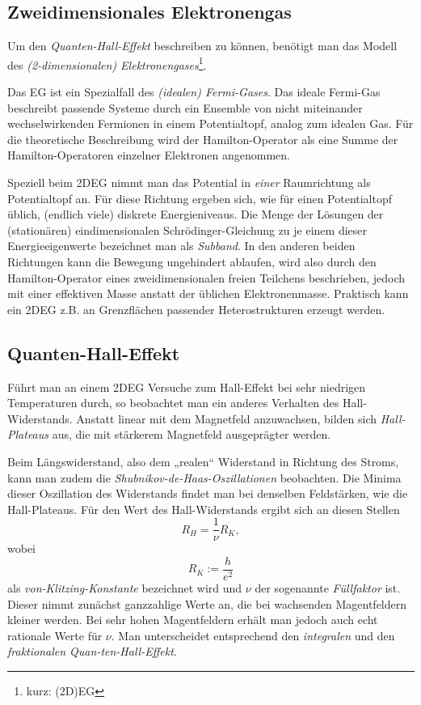 \subsection{Zweidimensionales Elektronengas}
Um den \emph{Quanten-Hall-Effekt} beschreiben zu können, benötigt man das Modell des \emph{(2-dimensionalen) Elektronengases}\footnote{kurz: (2D)EG}.

Das EG ist ein Spezialfall des \emph{(idealen) Fermi-Gases}. Das ideale Fermi-Gas beschreibt passende Systeme durch ein Ensemble von nicht miteinander wechselwirkenden Fermionen in einem Potentialtopf, analog zum idealen Gas.
Für die theoretische Beschreibung wird der Hamilton-Operator als eine Summe der Hamilton-Operatoren einzelner Elektronen angenommen.

Speziell beim 2DEG nimmt man das Potential in \emph{einer} Raumrichtung als Potentialtopf an. Für diese Richtung ergeben sich, wie für einen Potentialtopf üblich, (endlich viele) diskrete Energieniveaus. Die Menge der Lösungen der (stationären) eindimensionalen Schrödinger-Gleichung zu je einem dieser Energieeigenwerte bezeichnet man als \emph{Subband}.
In den anderen beiden Richtungen kann die Bewegung ungehindert ablaufen, wird also durch den Hamilton-Operator eines zweidimensionalen freien Teilchens beschrieben, jedoch mit einer effektiven Masse anstatt der üblichen Elektronenmasse.
Praktisch kann ein 2DEG z.B. an Grenzflächen passender Heterostrukturen erzeugt werden.

\clearpage

\subsection{Quanten-Hall-Effekt}\label{sec:Quanten-Hall-Effekt}
Führt man an einem 2DEG Versuche zum Hall-Effekt bei sehr niedrigen Temperaturen durch, so beobachtet man ein anderes Verhalten des Hall-Widerstands. Anstatt linear mit dem Magnetfeld anzuwachsen, bilden sich \emph{Hall-Plateaus} aus, die mit stärkerem Magnetfeld ausgeprägter werden.

Beim Längswiderstand, also dem „realen“ Widerstand in Richtung des Stroms, kann man zudem die \emph{Shubnikov-de-Haas-Oszillationen} beobachten. Die Minima dieser Oszillation des Widerstands findet man bei denselben Feldstärken, wie die Hall-Plateaus. Für den Wert des Hall-Widerstands ergibt sich an diesen Stellen
\begin{equation}\label{eq:HallvKl}
R_H = \frac{1}{\nu}R_K,
\end{equation}
wobei
\begin{equation}\label{eq:vKlitzing}
R_K := \frac{h}{e^2}
\end{equation}
als \emph{von-Klitzing-Konstante} bezeichnet wird und $\nu$ der sogenannte \emph{Füllfaktor} ist. Dieser nimmt zunächst ganzzahlige Werte an, die bei wachsenden Magentfeldern kleiner werden. Bei sehr hohen Magentfeldern erhält man jedoch auch echt rationale Werte für $\nu$. Man unterscheidet entsprechend den \emph{integralen} und den \emph{fraktionalen Quan-ten-Hall-Effekt}.

